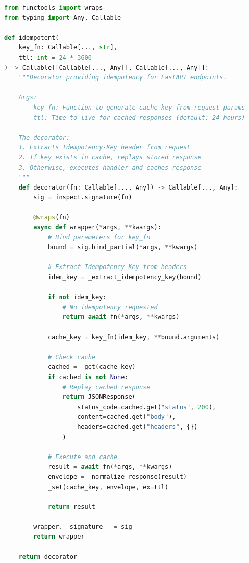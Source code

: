 \begin{lstlisting}[language=Python, caption={Idempotency decorator from \texttt{src/utils/idempotency.py}.}]
from functools import wraps
from typing import Any, Callable

def idempotent(
    key_fn: Callable[..., str], 
    ttl: int = 24 * 3600
) -> Callable[[Callable[..., Any]], Callable[..., Any]]:
    """Decorator providing idempotency for FastAPI endpoints.
    
    Args:
        key_fn: Function to generate cache key from request params
        ttl: Time-to-live for cached responses (default: 24 hours)
    
    The decorator:
    1. Extracts Idempotency-Key header from request
    2. If key exists in cache, replays stored response
    3. Otherwise, executes handler and caches response
    """
    def decorator(fn: Callable[..., Any]) -> Callable[..., Any]:
        sig = inspect.signature(fn)
        
        @wraps(fn)
        async def wrapper(*args, **kwargs):
            # Bind parameters for key_fn
            bound = sig.bind_partial(*args, **kwargs)
            
            # Extract Idempotency-Key from headers
            idem_key = _extract_idempotency_key(bound)
            
            if not idem_key:
                # No idempotency requested
                return await fn(*args, **kwargs)
            
            cache_key = key_fn(idem_key, **bound.arguments)
            
            # Check cache
            cached = _get(cache_key)
            if cached is not None:
                # Replay cached response
                return JSONResponse(
                    status_code=cached.get("status", 200),
                    content=cached.get("body"),
                    headers=cached.get("headers", {})
                )
            
            # Execute and cache
            result = await fn(*args, **kwargs)
            envelope = _normalize_response(result)
            _set(cache_key, envelope, ex=ttl)
            
            return result
        
        wrapper.__signature__ = sig
        return wrapper
    
    return decorator
\end{lstlisting}

